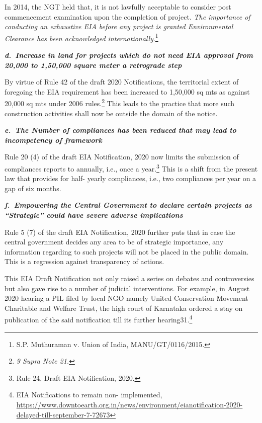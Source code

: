 \begin{multicols}{2}
\noi
In 2014, the NGT held that, it is not lawfully acceptable to consider post commencement
examination upon the completion of project. \textit{The importance of conducting an exhaustive EIA
before any project is granted Environmental Clearance has been acknowledged
internationally}.\footnote{S.P. Muthuraman v. Union of India, MANU/GT/0116/2015.}

\noi
{\large\it\bfseries d.~Increase in land for projects which do not need EIA approval from 20,000 to 1,50,000 square meter a retrograde step}

\noi
By virtue of Rule 42 of the draft 2020 Notifications, the territorial extent of foregoing the
EIA requirement has been increased to 1,50,000 sq mts as against 20,000 sq mts under 2006
rules.\footnote{\textit{9 Supra Note 21.}} This leads to the practice that more such construction activities shall now be outside
the domain of the notice.

\noi
{\large\it\bfseries e.~The Number of compliances has been reduced that may lead to incompetency of framework }

\noi
Rule 20 (4) of the draft EIA Notification, 2020 now limits the submission of compliances
reports to annually, i.e., once a year.\footnote{Rule 24, Draft EIA Notification, 2020.} This is a shift from the present law that provides for
half- yearly compliances, i.e., two compliances per year on a gap of six months. 

\noi
{\large\it\bfseries f.~Empowering the Central Government to declare certain projects as “Strategic” could have severe adverse implications}

\noi
Rule 5 (7) of the draft EIA Notification, 2020 further puts that in case the central government
decides any area to be of strategic importance, any information regarding to such projects
will not be placed in the public domain. This is a regression against transparency of actions.


\noi
This EIA Draft Notification not only raised a series on debates and controversies but also
gave rise to a number of judicial interventions. For example, in August 2020 hearing a PIL
filed by local NGO namely United Conservation Movement Charitable and Welfare Trust,
the high court of Karnataka ordered a stay on publication of the said notification till its
further hearing31.\footnote{EIA Notifications to remain non- implemented, \url{https://www.downtoearth.org.in/news/environment/eianotification-2020-delayed-till-september-7-72673}}


\end{multicols}
